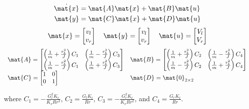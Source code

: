 \begin{theorem}
  \label{thm:diff_drive_velocity_ss_model}
  \begin{align*}
    \dot{\mat{x}} &= \mat{A} \mat{x} + \mat{B} \mat{u} \\
    \mat{y} &= \mat{C} \mat{x} + \mat{D} \mat{u}
  \end{align*}
  \begin{equation*}
    \mat{x} =
    \begin{bmatrix}
      v_l \\
      v_r
    \end{bmatrix}
    \quad
    \mat{y} =
    \begin{bmatrix}
      v_l \\
      v_r
    \end{bmatrix}
    \quad
    \mat{u} =
    \begin{bmatrix}
      V_l \\
      V_r
    \end{bmatrix}
  \end{equation*}
  \begin{equation}
    \label{eq:diff_drive_ss_model}
    \begin{array}{ll}
      \mat{A} =
      \begin{bmatrix}
        \left(\frac{1}{m} + \frac{r_b^2}{J}\right) C_1 & \left(\frac{1}{m} - \frac{r_b^2}{J}\right) C_3 \\
        \left(\frac{1}{m} - \frac{r_b^2}{J}\right) C_1 & \left(\frac{1}{m} + \frac{r_b^2}{J}\right) C_3
      \end{bmatrix} &
      \mat{B} =
      \begin{bmatrix}
        \left(\frac{1}{m} + \frac{r_b^2}{J}\right) C_2 & \left(\frac{1}{m} - \frac{r_b^2}{J}\right) C_4 \\
        \left(\frac{1}{m} - \frac{r_b^2}{J}\right) C_2 & \left(\frac{1}{m} + \frac{r_b^2}{J}\right) C_4
      \end{bmatrix} \\
      \mat{C} =
      \begin{bmatrix}
        1 & 0 \\
        0 & 1 \\
      \end{bmatrix} &
      \mat{D} = \mat{0}_{2 \times 2}
    \end{array}
  \end{equation}

  where $C_1 = -\frac{G_l^2 K_t}{K_v R r^2}$, $C_2 = \frac{G_l K_t}{Rr}$,
  $C_3 = -\frac{G_r^2 K_t}{K_v R r^2}$, and $C_4 = \frac{G_r K_t}{Rr}$.
\end{theorem}

